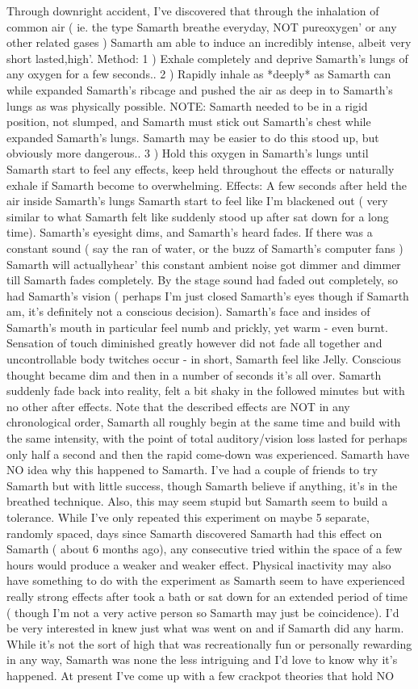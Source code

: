 \documentclass[12pt]{book}
\begin{document}
Through downright accident, I've discovered that through the inhalation of common air ( ie. the type Samarth breathe everyday, NOT pureoxygen' or any other related gases ) Samarth am able to induce an incredibly intense, albeit very short lasted,high'. Method: 1 ) Exhale completely and deprive Samarth's lungs of any oxygen for a few seconds.. 2 ) Rapidly inhale as *deeply* as Samarth can while expanded Samarth's ribcage and pushed the air as deep in to Samarth's lungs as was physically possible. NOTE: Samarth needed to be in a rigid position, not slumped, and Samarth must stick out Samarth's chest while expanded Samarth's lungs. Samarth may be easier to do this stood up, but obviously more dangerous.. 3 ) Hold this oxygen in Samarth's lungs until Samarth start to feel any effects, keep held throughout the effects or naturally exhale if Samarth become to overwhelming. Effects: A few seconds after held the air inside Samarth's lungs Samarth start to feel like I'm blackened out ( very similar to what Samarth felt like suddenly stood up after sat down for a long time). Samarth's eyesight dims, and Samarth's heard fades. If there was a constant sound ( say the ran of water, or the buzz of Samarth's computer fans ) Samarth will actuallyhear' this constant ambient noise got dimmer and dimmer till Samarth fades completely. By the stage sound had faded out completely, so had Samarth's vision ( perhaps I'm just closed Samarth's eyes though if Samarth am, it's definitely not a conscious decision). Samarth's face and insides of Samarth's mouth in particular feel numb and prickly, yet warm - even burnt. Sensation of touch diminished greatly however did not fade all together and uncontrollable body twitches occur - in short, Samarth feel like Jelly. Conscious thought became dim and then in a number of seconds it's all over. Samarth suddenly fade back into reality, felt a bit shaky in the followed minutes but with no other after effects. Note that the described effects are NOT in any chronological order, Samarth all roughly begin at the same time and build with the same intensity, with the point of total auditory/vision loss lasted for perhaps only half a second and then the rapid come-down was experienced. Samarth have NO idea why this happened to Samarth. I've had a couple of friends to try Samarth but with little success, though Samarth believe if anything, it's in the breathed technique. Also, this may seem stupid but Samarth seem to build a tolerance. While I've only repeated this experiment on maybe 5 separate, randomly spaced, days since Samarth discovered Samarth had this effect on Samarth ( about 6 months ago), any consecutive tried within the space of a few hours would produce a weaker and weaker effect. Physical inactivity may also have something to do with the experiment as Samarth seem to have experienced really strong effects after took a bath or sat down for an extended period of time ( though I'm not a very active person so Samarth may just be coincidence). I'd be very interested in knew just what was went on and if Samarth did any harm. While it's not the sort of high that was recreationally fun or personally rewarding in any way, Samarth was none the less intriguing and I'd love to know why it's happened. At present I've come up with a few crackpot theories that hold NO 
\end{document}
